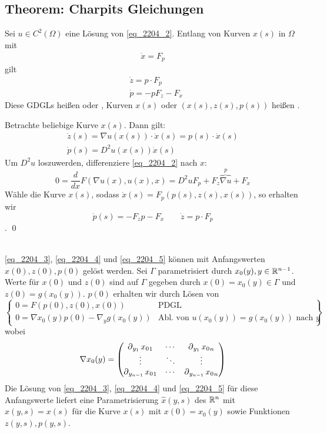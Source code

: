\subsection{Theorem: Charpits Gleichungen}
\label{thm_charpits} \label{thm_4}
	Sei $u \in C^2(\Omega)$ eine Lösung von \eqref{eq_2204_2}.\marginnote{[4]} Entlang von Kurven $x(s)$ in $\Omega$ mit
	\begin{equation}
	\begin{aligned}
		\dot{x} = F_p \label{eq_2204_3}
	\end{aligned}
	\end{equation}
	gilt
	\begin{align}
		&\dot{z} = p \cdot F_p \label{eq_2204_4} \\
		&\dot{p} = -pF_z - F_x \label{eq_2204_5}
	\end{align}
	Diese GDGLs heißen  oder , Kurven $x(s)$ oder $(x(s),z(s),p(s))$ heißen .
	
	Betrachte beliebige Kurve $x(s)$. Dann gilt:
	\[ \begin{array}{c}
		\dot{z}(s) = \nabla u(x(s)) \cdot \dot{x}(s) = p(s) \cdot \dot{x}(s) \\
		\dot{p}(s) = D^2u(x(s)) \dot{x}(s)
	\end{array} \]
	Um $D^2u$ loszuwerden, differenziere \eqref{eq_2204_2} nach $x$:
	\[ 0 = \frac{d}{dx} F(\nabla u(x),u(x),x) = D^2 u F_p + F_z \overbrace{\nabla u}^p + F_x \]
	Wähle die Kurve $x(s)$, sodass $\dot{x}(s) = F_p(p(s),z(s),x(s))$, so erhalten wir
	\[ \dot{p}(s) = -F_z p - F_x \qquad \dot{z} = p \cdot F_p \]. \qed

\mbox{} \\
\eqref{eq_2204_3}, \eqref{eq_2204_4} und \eqref{eq_2204_5} können mit Anfangswerten $x(0),z(0),p(0)$ gelöst werden. Sei $\Gamma$ parametrisiert durch $x_0(y), y \in \mathbb{R}^{n-1}$. Werte für $x(0)$ und $z(0)$ sind auf $\Gamma$ gegeben durch $x(0) = x_0(y) \in \Gamma$ und $z(0) = g(x_0(y))$. $p(0)$ erhalten wir durch Lösen von
\begin{equation}
	\left. \begin{cases}
	0 = F(p(0),z(0),x(0)) & \text{PDGL} \\
	0 = \nabla x_0 (y) p(0) - \nabla_y g(x_0(y)) & \text{Abl. von } u(x_0(y)) = g(x_0(y)) \text{ nach } y
	\end{cases} \right\}  \label{eq_2204_7} \end{equation}
wobei
	\[ \nabla x_0 (y) = \begin{pmatrix}
	\operatorname{\partial}_{y_1} {x_0}_1 & \cdots & \operatorname{\partial}_{y_1} {x_0}_n \\ 
	\vdots & \ddots & \vdots \\ 
	\operatorname{\partial}_{y_{n-1}} {x_0}_1 & \cdots & \operatorname{\partial}_{y_{n-1}} {x_0}_n
	\end{pmatrix} \]
Die Lösung von \eqref{eq_2204_3}, \eqref{eq_2204_4} und \eqref{eq_2204_5} für diese Anfangswerte liefert eine Parametrisierung $\widehat{x}(y,s)$ des $\mathbb{R}^n$ mit $\widehat{x}(y,s) = x(s)$ für die Kurve $x(s)$ mit $x(0) = x_0(y)$ sowie Funktionen $z(y,s),p(y,s)$.


